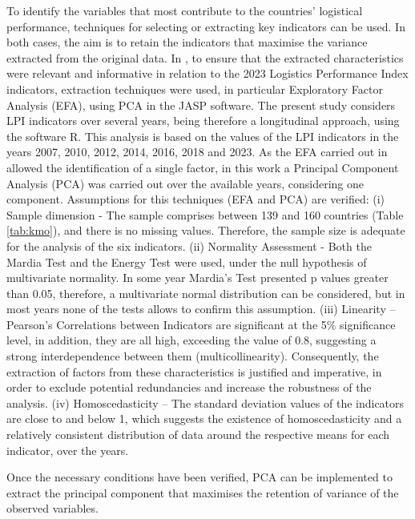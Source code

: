 \documentclass[a4paper,11pt,twoside]{article}
\begin{document}
To identify the variables that most contribute  to the countries' logistical performance, techniques for selecting or extracting key indicators can be used. In both cases, the aim is to retain the indicators that maximise the variance extracted from the original data. 
%
In \cite{correiaICIE}, to ensure that the extracted characteristics were relevant and informative in relation to the 2023 Logistics Performance Index indicators, extraction techniques were used, in particular Exploratory Factor Analysis (EFA), using PCA in the JASP software.
%
The present study considers LPI indicators over several years, being therefore a longitudinal approach, using the software R.
%
This analysis is based on the values of the LPI %
indicators in the years 2007, 2010, 2012, 2014, 2016, 2018 and 2023.
%
As the EFA carried out in \cite{correiaICIE} allowed the identification of a single factor, in this work a Principal Component Analysis (PCA) was carried out over the available years, considering one component.
%
Assumptions for this techniques (EFA and PCA)  are verified: 
%
(i) Sample dimension - The sample comprises between 139 and 160 countries (Table \ref{tab:kmo}), and there is no missing values. Therefore, the sample size is adequate for the analysis of the six indicators.
%
(ii) Normality Assessment - Both the Mardia Test and the Energy Test were used, under the null hypothesis of multivariate normality.
In some year Mardia's Test presented p values greater than 0.05, therefore, a multivariate normal distribution can be considered, but in most years none of the tests allows to confirm this assumption.
%
(iii) Linearity -- Pearson's Correlations between Indicators are significant at the 5\% significance level, in addition, they are all high, exceeding the value of 0.8, suggesting a strong interdependence between them (multicollinearity).
Consequently, the extraction of factors from these characteristics is justified and imperative, in order to exclude potential redundancies and increase the robustness of the analysis.
%
(iv) Homoscedasticity -- The standard deviation values of the indicators are close to and below 1, which suggests the existence of homoscedasticity and a relatively consistent distribution of data around the respective means for each indicator, over the years.

Once the necessary conditions have been verified, PCA can be implemented to extract the principal component that maximises the retention of variance of the observed variables.
\end{document}
